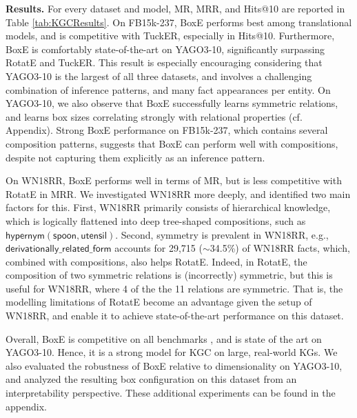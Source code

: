 \documentclass{article}
\begin{document}
\textbf{Results.} For every dataset and model, MR, MRR, and  Hits@10 are reported in Table \ref{tab:KGCResults}. On FB15k-237, BoxE performs best among translational models, and is competitive with TuckER, especially in Hits@10. 
Furthermore, BoxE is comfortably state-of-the-art on YAGO3-10, significantly surpassing RotatE and TuckER. This result is especially encouraging considering that YAGO3-10 is the largest of all three datasets, and involves a challenging combination of inference patterns, and many fact appearances per entity. On YAGO3-10, we also observe that BoxE successfully learns symmetric relations, and learns box sizes correlating strongly with relational properties (cf. Appendix). Strong BoxE performance on FB15k-237, which contains several composition patterns, suggests that BoxE can perform well with compositions, despite not capturing them explicitly as an inference pattern.

On WN18RR, BoxE performs well in terms of MR, but is less competitive with RotatE in MRR. We investigated WN18RR more deeply, and identified two main factors for this. First, WN18RR primarily consists of hierarchical knowledge, which is logically flattened into deep tree-shaped compositions, such as $\mathsf{hypernym(spoon, utensil)}$.
Second, symmetry is prevalent in WN18RR, e.g., $\mathsf{derivationally\_related\_form}$ accounts for 29,715 ($\sim$34.5\%) of WN18RR facts, which, combined with compositions, also helps RotatE. Indeed, in RotatE, the composition of two symmetric relations is (incorrectly) symmetric, but this is useful for WN18RR, where 4 of the the 11 relations are symmetric. That is, the modelling limitations of RotatE become an advantage given the  setup of WN18RR, and enable it to achieve state-of-the-art performance on this dataset.
 
Overall, BoxE is competitive on all benchmarks , and is state of the art on YAGO3-10. Hence, it is a strong model for KGC on large, real-world KGs. We also evaluated the robustness of BoxE relative to dimensionality on YAGO3-10, and analyzed the resulting box configuration on this dataset from an interpretability perspective. These additional experiments can be found in the appendix.
\end{document}

